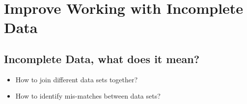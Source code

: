 \documentclass{memoir}
\begin{document}

\chapter{Improve Working with Incomplete Data}

\hypertarget{incomplete-data-what-does-it-mean}{%
\section{Incomplete Data, what does it
mean?}\label{incomplete-data-what-does-it-mean}}

\begin{tcolorbox}[enhanced jigsaw, bottomrule=.15mm, opacityback=0, left=2mm, breakable, colframe=quarto-callout-important-color-frame, arc=.35mm, rightrule=.15mm, colback=white, leftrule=.75mm, toprule=.15mm]
\begin{minipage}[t]{5.5mm}
\textcolor{quarto-callout-important-color}{\faExclamation}
\end{minipage}%
\begin{minipage}[t]{\textwidth - 5.5mm}

\begin{itemize}
\item
  How to join different data sets together?
\item
  How to identify mis-matches between data sets?
\end{itemize}

\end{minipage}%
\end{tcolorbox}
\end{document}
